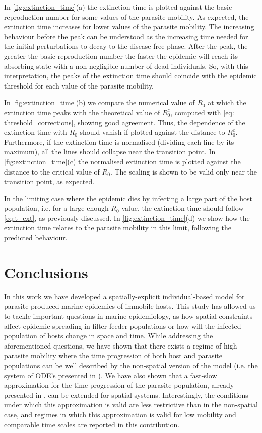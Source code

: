 In \cref{fig:extinction_time}(a) the extinction time is plotted against the
basic reproduction number for some values of the parasite mobility. As
expected, the extinction time increases for lower values of the parasite
mobility. The increasing behaviour before the peak can be understood as the
increasing time needed for the initial perturbations to decay to the
disease-free phase. After the peak, the greater the basic reproduction number
the faster the epidemic will reach its absorbing state with a non-negligible
number of dead individuals. So, with this interpretation, the peaks of the
extinction time should coincide with the epidemic threshold for each value of
the parasite mobility.

In \cref{fig:extinction_time}(b) we compare the numerical value of $R_0$ at
which the extinction time peaks with the theoretical value of $R_0^c$, computed
with \cref{eq: threshold_corrections}, showing good agreement. Thus, the
dependence of the extinction time with $R_0$ should vanish if plotted against
the distance to $R_0^c$. Furthermore, if the extinction time is normalised
(dividing each line by its maximum), all the lines should collapse near the
transition point. In \cref{fig:extinction_time}(c) the normalised extinction
time is plotted against the distance to the critical value of $R_0$. The
scaling is shown to be valid only near the transition point, as expected.

In the limiting case where the epidemic dies by infecting a large part of
the host population, i.e. for a large enough $R_0$ value, the extinction time
should follow \cref{eq:t_ext}, as previously discussed. In
\cref{fig:extinction_time}(d) we show how the extinction time relates to the
parasite mobility in this limit, following the predicted behaviour.

\section{Conclusions} \label{sec: conclusions}

In this work we have developed a spatially-explicit individual-based model
for parasite-produced marine epidemics of immobile hosts. This study has
allowed us to tackle important questions in marine epidemiology, as how spatial
constraints affect epidemic spreading in filter-feeder populations or how will
the infected population of hosts change in space and time. While addressing the
aforementioned questions, we have shown that there exists a regime of high
parasite mobility where the time progression of both host and parasite
populations can be well described by the non-spatial version of the model (i.e.
the system of ODE's presented in \cite{GimenezRomero2021}). We have also shown
that a fast-slow approximation for the time progression of the parasite
population, already presented in \cite{GimenezRomero2021}, can be extended for
spatial systems. Interestingly, the conditions under which this approximation
is valid  are less restrictive than in the non-spatial case, and regimes in
which this approximation is valid for low mobility and comparable time scales
are reported in this contribution.

